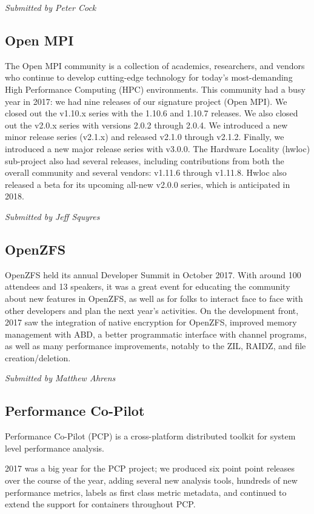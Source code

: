 \documentclass[a4paper]{report}
\begin{document}
{\em Submitted by Peter Cock}

\subsection{Open MPI}

The Open MPI community is a collection of academics, researchers, and
vendors who continue to develop cutting-edge technology for today's
most-demanding High Performance Computing (HPC) environments.  This
community had a busy year in 2017: we had nine releases of our signature
project (Open MPI).  We closed out the v1.10.x series with the 1.10.6
and 1.10.7 releases.  We also closed out the v2.0.x series with versions
2.0.2 through 2.0.4.  We introduced a new minor release series (v2.1.x)
and released v2.1.0 through v2.1.2.  Finally, we introduced a new major
release series with v3.0.0.  The Hardware Locality (hwloc) sub-project
also had several releases, including contributions from both the overall
community and several vendors: v1.11.6 through v1.11.8.  Hwloc also
released a beta for its upcoming all-new v2.0.0 series, which is
anticipated in 2018.

{\em Submitted by Jeff Squyres}

\subsection{OpenZFS}

OpenZFS held its annual Developer Summit in October 2017.  With around
100 attendees and 13 speakers, it was a great event for educating the
community about new features in OpenZFS, as well as for folks to
interact face to face with other developers and plan the next year's
activities.  On the development front, 2017 saw the integration of
native encryption for OpenZFS, improved memory management with ABD, a
better programmatic interface with channel programs, as well as many
performance improvements, notably to the ZIL, RAIDZ, and file
creation/deletion.

{\em Submitted by Matthew Ahrens}

\subsection{Performance Co-Pilot}

Performance Co-Pilot (PCP) is a cross-platform distributed toolkit for
system level performance analysis.

2017 was a big year for the PCP project; we produced six point point
releases over the course of the year, adding several new analysis tools,
hundreds of new performance metrics, labels as first class metric
metadata, and continued to extend the support for containers throughout
PCP.
\end{document}
